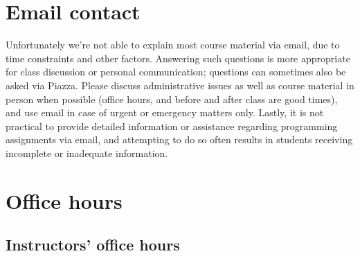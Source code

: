 \documentclass[11pt]{article}
\begin{document}

  \vspace*{-6mm}

  \section{Email contact\label{section:email}}

    Unfortunately we're not able to explain most course material via email,
  due to time constraints and other factors.  Answering such questions is
  more appropriate for class discussion or personal communication; questions
  can sometimes also be asked via Piazza.  Please discuss administrative
  issues as well as course material in person when possible (office hours,
  and before and after class are good times), and use email in case of
  urgent or emergency matters only.  Lastly, it is not practical to provide
  detailed information or assistance regarding programming assignments via
  email, and attempting to do so often results in students receiving
  incomplete or inadequate information.

  \section{Office hours}

    \subsection{Instructors' office hours}
\end{document}
